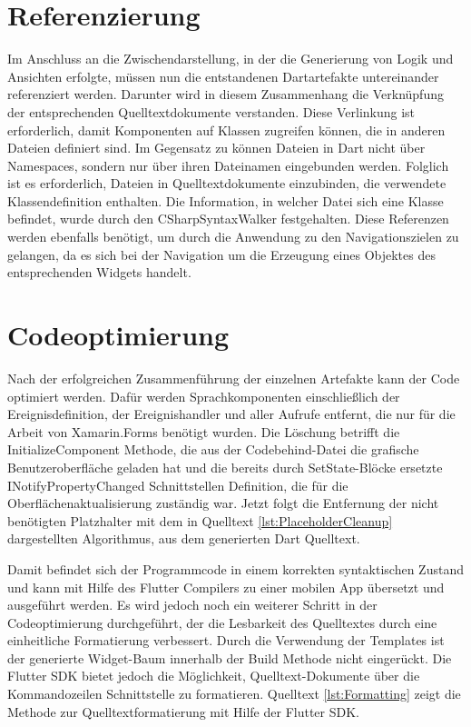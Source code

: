 \section{Referenzierung}
Im Anschluss an die Zwischendarstellung, in der die Generierung von Logik und Ansichten erfolgte,  müssen nun die entstandenen Dartartefakte untereinander referenziert werden.  Darunter wird in diesem Zusammenhang die Verknüpfung der entsprechenden Quelltextdokumente verstanden.  Diese Verlinkung ist erforderlich,  damit Komponenten auf Klassen zugreifen können,  die in anderen Dateien definiert sind.  Im Gegensatz zu \Csharp{} können Dateien in Dart nicht über Namespaces, sondern nur über ihren Dateinamen eingebunden werden.  Folglich ist es erforderlich,  Dateien in Quelltextdokumente einzubinden,  die verwendete Klassendefinition enthalten.  Die Information,  in welcher Datei sich eine Klasse befindet, wurde durch den \glq CSharpSyntaxWalker\grq{} festgehalten.  Diese Referenzen werden ebenfalls benötigt,  um durch die Anwendung zu den Navigationszielen zu gelangen, da es sich bei der Navigation um die Erzeugung eines Objektes des entsprechenden Widgets handelt. 


\section{Codeoptimierung}

Nach der erfolgreichen Zusammenführung der einzelnen Artefakte kann der Code optimiert werden. Dafür werden Sprachkomponenten einschließlich der Ereignisdefinition,  der Ereignishandler und aller Aufrufe entfernt, die  nur für die  Arbeit von Xamarin.Forms benötigt  wurden. Die Löschung betrifft die \glq InitializeComponent\grq{}  Methode, die aus der Codebehind-Datei die grafische Benutzeroberfläche geladen hat und die bereits durch SetState-Blöcke ersetzte
 \glq INotifyPropertyChanged\grq{}  Schnittstellen Definition,  die für die Oberflächenaktualisierung zuständig war.  Jetzt folgt die Entfernung der nicht benötigten Platzhalter mit dem in Quelltext \ref{lst:PlaceholderCleanup} dargestellten Algorithmus,  aus dem generierten Dart Quelltext.  

Damit befindet sich der Programmcode in einem korrekten syntaktischen Zustand und kann mit Hilfe des Flutter Compilers zu einer mobilen App übersetzt und ausgeführt werden.  Es wird jedoch noch ein weiterer Schritt in der Codeoptimierung durchgeführt,  der die Lesbarkeit des Quelltextes durch eine einheitliche Formatierung verbessert.  Durch die Verwendung der Templates ist der generierte  Widget-Baum innerhalb der Build Methode nicht eingerückt.  Die Flutter SDK bietet jedoch die Möglichkeit,  Quelltext-Dokumente über die Kommandozeilen Schnittstelle zu formatieren.  Quelltext \ref{lst:Formatting} zeigt die Methode zur Quelltextformatierung mit Hilfe der Flutter SDK. 

